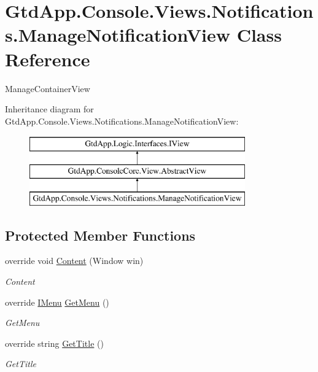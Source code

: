 \hypertarget{class_gtd_app_1_1_console_1_1_views_1_1_notifications_1_1_manage_notification_view}{}\section{Gtd\+App.\+Console.\+Views.\+Notifications.\+Manage\+Notification\+View Class Reference}
\label{class_gtd_app_1_1_console_1_1_views_1_1_notifications_1_1_manage_notification_view}


Manage\+Container\+View  


Inheritance diagram for Gtd\+App.\+Console.\+Views.\+Notifications.\+Manage\+Notification\+View\+:\begin{figure}[H]
\begin{center}
\leavevmode
\includegraphics[height=3.000000cm]{class_gtd_app_1_1_console_1_1_views_1_1_notifications_1_1_manage_notification_view}
\end{center}
\end{figure}
\subsection*{Protected Member Functions}
\begin{DoxyCompactItemize}
\item 
override void \mbox{\hyperlink{class_gtd_app_1_1_console_1_1_views_1_1_notifications_1_1_manage_notification_view_a756cd48ab1bef286f2f983432416cba6}{Content}} (Window win)
\begin{DoxyCompactList}\small\item\em Content \end{DoxyCompactList}\item 
override \mbox{\hyperlink{interface_gtd_app_1_1_console_core_1_1_menu_1_1_i_menu}{I\+Menu}} \mbox{\hyperlink{class_gtd_app_1_1_console_1_1_views_1_1_notifications_1_1_manage_notification_view_a2baf4336e970b64dd3c286820fe12fae}{Get\+Menu}} ()
\begin{DoxyCompactList}\small\item\em Get\+Menu \end{DoxyCompactList}\item 
override string \mbox{\hyperlink{class_gtd_app_1_1_console_1_1_views_1_1_notifications_1_1_manage_notification_view_a400ecb489c2328d49e6cd13f4d60cb79}{Get\+Title}} ()
\begin{DoxyCompactList}\small\item\em Get\+Title \end{DoxyCompactList}\end{DoxyCompactItemize}
